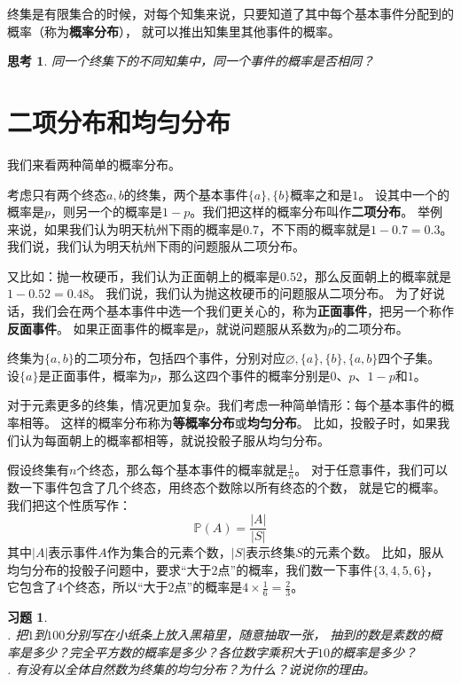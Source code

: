 \documentclass[12pt,UTF8]{ctexbook}
\newtheorem{sk}{思考}[section]
\newtheorem{xt}{习题}[section]
\begin{document}
终集是有限集合的时候，对每个知集来说，只要知道了其中每个基本事件分配到的概率（称为\textbf{概率分布}），
就可以推出知集里其他事件的概率。

\begin{sk}
    同一个终集下的不同知集中，同一个事件的概率是否相同？
\end{sk}

\section{二项分布和均匀分布}

我们来看两种简单的概率分布。

考虑只有两个终态$a, b$的终集，两个基本事件$\{a\}, \{b\}$概率之和是$1$。
设其中一个的概率是$p$，则另一个的概率是$1-p$。我们把这样的概率分布叫作\textbf{二项分布}。
举例来说，如果我们认为明天杭州下雨的概率是$0.7$，不下雨的概率就是$1-0.7=0.3$。
我们说，我们认为明天杭州下雨的问题服从二项分布。

又比如：抛一枚硬币，我们认为正面朝上的概率是$0.52$，那么反面朝上的概率就是$1 - 0.52 = 0.48$。
我们说，我们认为抛这枚硬币的问题服从二项分布。
为了好说话，我们会在两个基本事件中选一个我们更关心的，称为\textbf{正面事件}，把另一个称作\textbf{反面事件}。
如果正面事件的概率是$p$，就说问题服从系数为$p$的二项分布。

终集为$\{a, b\}$的二项分布，包括四个事件，分别对应$\varnothing, \{a\}, \{b\}, \{a, b\}$四个子集。
设$\{a\}$是正面事件，概率为$p$，那么这四个事件的概率分别是$0$、$p$、$1-p$和$1$。

对于元素更多的终集，情况更加复杂。我们考虑一种简单情形：每个基本事件的概率相等。
这样的概率分布称为\textbf{等概率分布}或\textbf{均匀分布}。
比如，投骰子时，如果我们认为每面朝上的概率都相等，就说投骰子服从均匀分布。

假设终集有$n$个终态，那么每个基本事件的概率就是$\frac{1}{n}$。
对于任意事件，我们可以数一下事件包含了几个终态，用终态个数除以所有终态的个数，
就是它的概率。我们把这个性质写作：
$$ \mathbb{P}(A) = \frac{|A|}{|S|} $$
其中$|A|$表示事件$A$作为集合的元素个数，$|S|$表示终集$S$的元素个数。 
比如，服从均匀分布的投骰子问题中，要求“大于$2$点”的概率，我们数一下事件$\{3,4,5,6\}$，
它包含了$4$个终态，所以“大于$2$点”的概率是$4 \times \frac{1}{6} = \frac{2}{3}$。

\begin{xt}
    \mbox{} \\
    . 把$1$到$100$分别写在小纸条上放入黑箱里，随意抽取一张，
    抽到的数是素数的概率是多少？完全平方数的概率是多少？各位数字乘积大于$10$的概率是多少？ \\
    . 有没有以全体自然数为终集的均匀分布？为什么？说说你的理由。
\end{xt}
\end{document}
